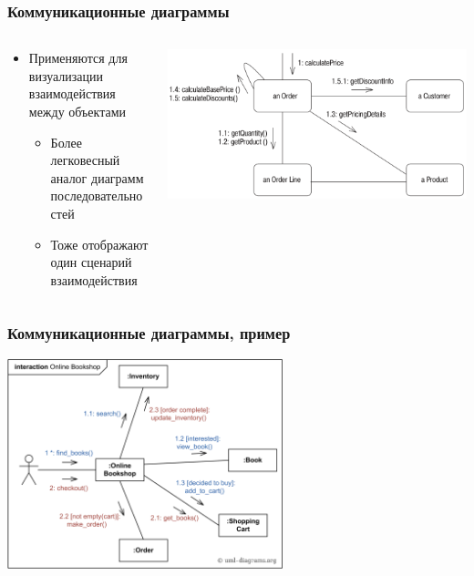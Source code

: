 \documentclass{../../slides-style}
\begin{document}
    \begin{frame}
        \frametitle{Коммуникационные диаграммы}
        \begin{columns}
            \begin{column}{0.5\textwidth}
                \begin{itemize}
                    \item Применяются для визуализации взаимодействия между объектами
                    \begin{itemize}
                        \item Более легковесный аналог диаграмм последовательностей
                        \item Тоже отображают один сценарий взаимодействия
                    \end{itemize}
                \end{itemize}
            \end{column}
            \begin{column}{0.5\textwidth}
                \begin{center}
                    \includegraphics[width=\textwidth]{communicationDiagram.png}
                \end{center}
            \end{column}
        \end{columns}
    \end{frame}

    \begin{frame}
        \frametitle{Коммуникационные диаграммы, пример}
        \begin{center}
            \includegraphics[width=0.6\textwidth]{communicationDiagramExample.png}
        \end{center}
    \end{frame}
\end{document}
